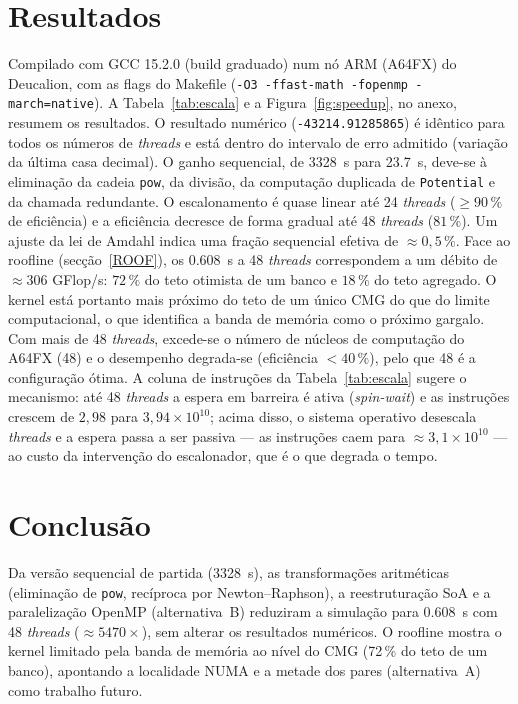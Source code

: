 \documentclass[conference]{IEEEtran}
\begin{document}
\section{Resultados}
Compilado com GCC 15.2.0 (build graduado) num nó ARM (A64FX) do Deucalion, com as flags do Makefile (\texttt{-O3 -ffast-math -fopenmp -march=native}). A Tabela~\ref{tab:escala} e a Figura~\ref{fig:speedup}, no anexo, resumem os resultados. O resultado numérico (\texttt{-43214.91285865}) é idêntico para todos os números de \textit{threads} e está dentro do intervalo de erro admitido (variação da última casa decimal). O ganho sequencial, de \SI{3328}{s} para \SI{23.7}{s}, deve-se à eliminação da cadeia \texttt{pow}, da divisão, da computação duplicada de \texttt{Potential} e da chamada redundante. O escalonamento é quase linear até 24 \textit{threads} ($\ge 90\,\%$ de eficiência) e a eficiência decresce de forma gradual até 48 \textit{threads} ($81\,\%$). Um ajuste da lei de Amdahl indica uma fração sequencial efetiva de $\approx 0{,}5\,\%$.
Face ao roofline (secção~\ref{ROOF}), os \SI{0.608}{s} a 48 \textit{threads} correspondem a um débito de $\approx306$ GFlop/s: $72\,\%$ do teto otimista de um banco e $18\,\%$ do teto agregado. O kernel está portanto mais próximo do teto de um único CMG do que do limite computacional, o que identifica a banda de memória como o próximo gargalo.
Com mais de 48 \textit{threads}, excede-se o número de núcleos de computação do A64FX (48) e o desempenho degrada-se (eficiência $<40\,\%$), pelo que 48 é a configuração ótima. A coluna de instruções da Tabela~\ref{tab:escala} sugere o mecanismo: até 48 \textit{threads} a espera em barreira é ativa (\textit{spin-wait}) e as instruções crescem de $2{,}98$ para $3{,}94\times10^{10}$; acima disso, o sistema operativo desescala \textit{threads} e a espera passa a ser passiva --- as instruções caem para $\approx3{,}1\times10^{10}$ --- ao custo da intervenção do escalonador, que é o que degrada o tempo.

\section{Conclusão}
Da versão sequencial de partida (\SI{3328}{s}), as transformações aritméticas (eliminação de \texttt{pow}, recíproca por Newton--Raphson), a reestruturação SoA e a paralelização OpenMP (alternativa~B) reduziram a simulação para \SI{0.608}{s} com 48 \textit{threads} ($\approx5470\times$), sem alterar os resultados numéricos. O roofline mostra o kernel limitado pela banda de memória ao nível do CMG (72\,\% do teto de um banco), apontando a localidade NUMA e a metade dos pares (alternativa~A) como trabalho futuro.
\end{document}
